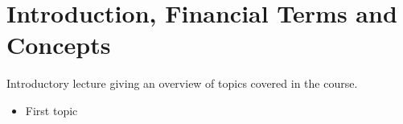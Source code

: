 \section{Introduction, Financial Terms and Concepts} %
\label{lec:1}

Introductory lecture giving an overview of topics covered in the course.

\begin{itemize}
  \item First topic
\end{itemize}

